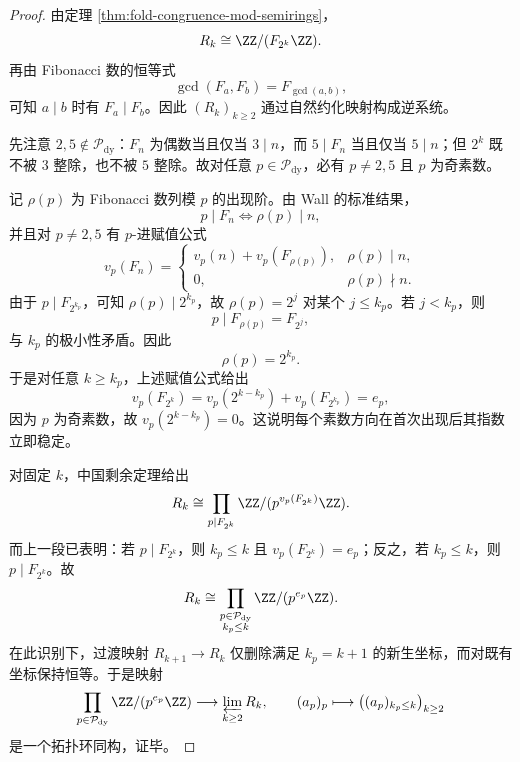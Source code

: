 \begin{proof}
由定理 \ref{thm:fold-congruence-mod-semirings}，
\[
R_k\cong \ZZ/(F_{2^k}\ZZ).
\]
再由 Fibonacci 数的恒等式
\[
\gcd(F_a,F_b)=F_{\gcd(a,b)},
\]
可知 \(a\mid b\) 时有 \(F_a\mid F_b\)。因此 \((R_k)_{k\ge 2}\) 通过自然约化映射构成逆系统。

先注意 \(2,5\notin\mathcal P_{\mathrm{dy}}\)：\(F_n\) 为偶数当且仅当 \(3\mid n\)，而 \(5\mid F_n\) 当且仅当 \(5\mid n\)；但 \(2^k\) 既不被 \(3\) 整除，也不被 \(5\) 整除。故对任意 \(p\in\mathcal P_{\mathrm{dy}}\)，必有 \(p\neq 2,5\) 且 \(p\) 为奇素数。

记 \(\rho(p)\) 为 Fibonacci 数列模 \(p\) 的出现阶。由 Wall 的标准结果，
\[
p\mid F_n \iff \rho(p)\mid n,
\]
并且对 \(p\neq 2,5\) 有 \(p\)-进赋值公式\cite{Wall1960FibonacciModm,RowlandMedina2009PadicValuationFibonacci}
\[
v_p(F_n)=
\begin{cases}
v_p(n)+v_p(F_{\rho(p)}), & \rho(p)\mid n,\\[1mm]
0, & \rho(p)\nmid n.
\end{cases}
\]
由于 \(p\mid F_{2^{k_p}}\)，可知 \(\rho(p)\mid 2^{k_p}\)，故 \(\rho(p)=2^j\) 对某个 \(j\le k_p\)。若 \(j<k_p\)，则
\[
p\mid F_{\rho(p)}=F_{2^j},
\]
与 \(k_p\) 的极小性矛盾。因此
\[
\rho(p)=2^{k_p}.
\]
于是对任意 \(k\ge k_p\)，上述赋值公式给出
\[
v_p(F_{2^k})
=
v_p(2^{k-k_p})+v_p(F_{2^{k_p}})
=
e_p,
\]
因为 \(p\) 为奇素数，故 \(v_p(2^{k-k_p})=0\)。这说明每个素数方向在首次出现后其指数立即稳定。

对固定 \(k\)，中国剩余定理给出
\[
R_k
\cong
\prod_{p\mid F_{2^k}}\ZZ/(p^{v_p(F_{2^k})}\ZZ).
\]
而上一段已表明：若 \(p\mid F_{2^k}\)，则 \(k_p\le k\) 且 \(v_p(F_{2^k})=e_p\)；反之，若 \(k_p\le k\)，则 \(p\mid F_{2^k}\)。故
\[
R_k
\cong
\prod_{\substack{p\in\mathcal P_{\mathrm{dy}}\\ k_p\le k}}
\ZZ/(p^{e_p}\ZZ).
\]
在此识别下，过渡映射 \(R_{k+1}\to R_k\) 仅删除满足 \(k_p=k+1\) 的新生坐标，而对既有坐标保持恒等。于是映射
\[
\prod_{p\in\mathcal P_{\mathrm{dy}}}\ZZ/(p^{e_p}\ZZ)
\longrightarrow
\varprojlim_{k\ge 2}R_k,
\qquad
(a_p)_p\longmapsto
\bigl((a_p)_{k_p\le k}\bigr)_{k\ge 2}
\]
是一个拓扑环同构，证毕。
\end{proof}

